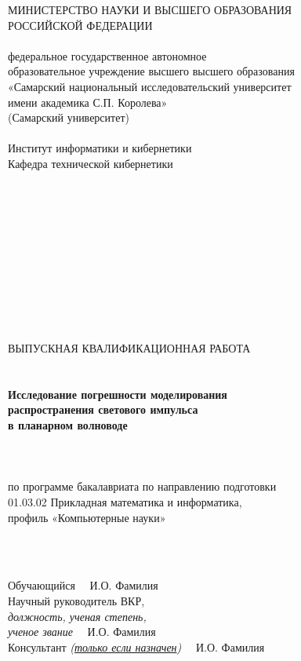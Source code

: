 \thispagestyle{empty}

\begin{center}{\normalsize\linespread{1}\selectfont
МИНИСТЕРСТВО НАУКИ И ВЫСШЕГО ОБРАЗОВАНИЯ\\
РОССИЙСКОЙ ФЕДЕРАЦИИ\\
\ \\
федеральное государственное автономное\\
образовательное учреждение высшего высшего образования\\
«Самарский национальный исследовательский университет\\
 имени академика С.П. Королева»\\
 (Самарский университет)\\
\ \\ 
Институт информатики и кибернетики\\
Кафедра технической кибернетики\\
{\fontsize{8pt}{8pt}\selectfont 
\ \\
\ \\
\ \\
\ \\
\ \\
\ \\
\ \\
\ \\
\ \\
\ \\
\ \\
}
ВЫПУСКНАЯ КВАЛИФИКАЦИОННАЯ РАБОТА\\
{\fontsize{8pt}{8pt}\selectfont 
\ \\
\ \\
}
\nohyphens{\fontsize{16pt}{\baselineskip}
\color{red}\bfseries\selectfont 
Исследование погрешности моделирования \\
распространения светового импульса\\
в планарном волноводе}\\
{\fontsize{8pt}{8pt}\selectfont 
\ \\
\ \\
\ \\
}
по программе бакалавриата по направлению подготовки\\
01.03.02  Прикладная математика и информатика,\\
профиль «Компьютерные науки»\\
}


\end{center}
\normalsize 

{\fontsize{8pt}{8pt}\selectfont 
\ \\
\ \\

}
{\linespread{1}\selectfont
\advance\leftskip 2cm
\advance\rightskip 1cm
\noindent
Обучающийся \hrulefill \ \ И.О. Фамилия\\
Научный руководитель ВКР,\\
{\itshape\color{red} должность, ученая степень,\\
ученое звание} \hrulefill \ \ И.О. Фамилия\\
{\color{red}Консультант 
\itshape\fontsize{10pt}{10pt}\selectfont
(\underline{только если назначен})} \hrulefill \ \ И.О. Фамилия\par
}

